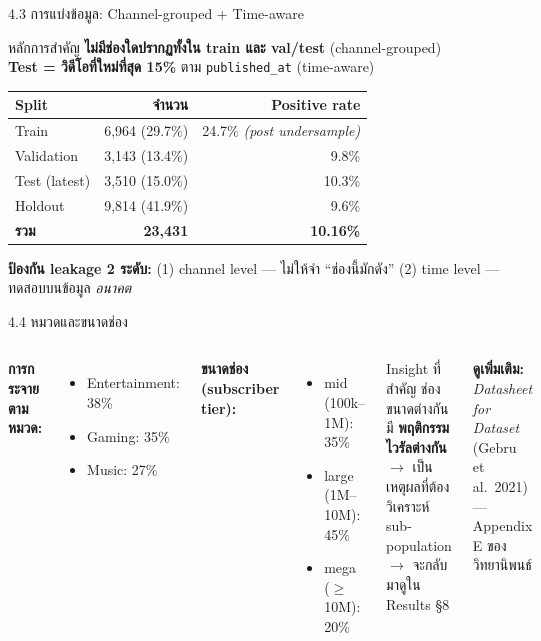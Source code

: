 \documentclass[aspectratio=169,11pt,xcolor=dvipsnames]{beamer}
\newcommand{\hl}[1]{\textcolor{kmitlOrange}{\textbf{#1}}}
\begin{document}
\begin{frame}{4.3 การแบ่งข้อมูล: Channel-grouped + Time-aware}
  \footnotesize
  \begin{block}{หลักการสำคัญ}
    \hl{ไม่มีช่องใดปรากฏทั้งใน train และ val/test} (channel-grouped) \\
    \hl{Test = วิดีโอที่ใหม่ที่สุด 15\%} ตาม \texttt{published\_at} (time-aware)
  \end{block}

  \begin{center}
    \begin{tabular}{lrr}
      \toprule
      \textbf{Split} & \textbf{จำนวน} & \textbf{Positive rate} \\
      \midrule
      Train          & 6{,}964 (29.7\%) & 24.7\% \emph{(post undersample)} \\
      Validation     & 3{,}143 (13.4\%) & 9.8\% \\
      Test (latest)  & 3{,}510 (15.0\%) & 10.3\% \\
      Holdout        & 9{,}814 (41.9\%) & 9.6\% \\
      \midrule
      \textbf{รวม}    & \textbf{23{,}431} & \textbf{10.16\%} \\
      \bottomrule
    \end{tabular}
  \end{center}

  \textbf{ป้องกัน leakage 2 ระดับ:} (1) channel level — ไม่ให้จำ ``ช่องนี้มักดัง''
  (2) time level — ทดสอบบนข้อมูล \emph{อนาคต}
\end{frame}

\begin{frame}{4.4 หมวดและขนาดช่อง}
  \begin{columns}[T]
    \textbf{การกระจายตามหมวด:}
    \begin{itemize}
      \item Entertainment: 38\%
      \item Gaming: 35\%
      \item Music: 27\%
    \end{itemize}
    \vspace{0.6em}
    \textbf{ขนาดช่อง (subscriber tier):}
    \begin{itemize}
      \item mid (100k--1M): 35\%
      \item large (1M--10M): 45\%
      \item mega ($\geq$10M): 20\%
    \end{itemize}
    \begin{block}{Insight ที่สำคัญ}
      ช่องขนาดต่างกันมี \hl{พฤติกรรมไวรัลต่างกัน}\\
      $\rightarrow$ เป็นเหตุผลที่ต้องวิเคราะห์ sub-population\\
      $\rightarrow$ จะกลับมาดูใน Results §8
    \end{block}
    \vspace{0.4em}
    \textbf{ดูเพิ่มเติม:} \emph{Datasheet for Dataset} (Gebru et al.\ 2021) — Appendix E ของวิทยานิพนธ์
  \end{columns}
\end{frame}
\end{document}
